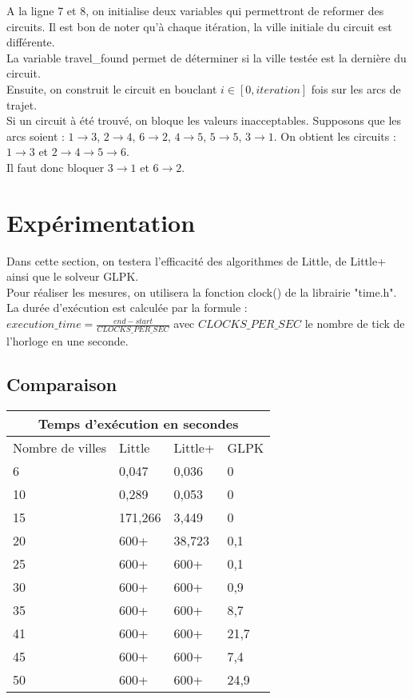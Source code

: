 \documentclass[a4paper]{article}
\begin{document}
A la ligne 7 et 8, on initialise deux variables qui permettront de reformer des circuits. Il est bon de noter qu'à chaque itération, la ville initiale du circuit est différente.\\
La variable travel\_found permet de déterminer si la ville testée est la dernière du circuit.\\
Ensuite, on construit le circuit en bouclant $i\in[0,iteration]$ fois sur les arcs de trajet.\\
Si un circuit à été trouvé, on bloque les valeurs inacceptables. Supposons que les arcs soient : 
$1 \rightarrow 3$,
$2 \rightarrow 4$,
$6 \rightarrow 2$,
$4 \rightarrow 5$,
$5 \rightarrow 5$,
$3 \rightarrow 1$.
On obtient les circuits : 
$1 \rightarrow 3$ et $2\rightarrow 4 \rightarrow 5 \rightarrow 6$.\\
Il faut donc bloquer $3 \rightarrow 1$ et $6 \rightarrow 2$.

\section{Expérimentation}

Dans cette section, on testera l'efficacité des algorithmes de Little, de Little+ ainsi que le solveur GLPK.\\
Pour réaliser les mesures, on utilisera la fonction clock() de la librairie "time.h". La durée d'exécution est calculée par la formule : $execution\_time = \frac{end-start}{CLOCKS\_PER\_SEC}$ avec $CLOCKS\_PER\_SEC$ le nombre de tick de l'horloge en une seconde.

\subsection{Comparaison}

\begin{table}[!ht]
    \begin{tabular}{ |p{2.5cm}||p{2.5cm}|p{2.5cm}|p{2.5cm}|  }
     \hline
     \multicolumn{4}{|c|}{Temps d'exécution en secondes} \\
     \hline
     Nombre de villes& Little &Little+&GLPK\\
     \hline
     6   & 0,047    &0,036   &   0\\
     10  &   0,289  & 0,053  &0\\
     15  &171,266   & 3,449  &  0\\
     20  & 600+      & 38,723 &  0,1\\
     25  &   600+   & 600+   &0,1\\
     30  & 600+     & 600+   &0,9\\
     35  &  600+    & 600+   &8,7\\
     41  & 600+     & 600+   &21,7\\
     45  & 600+     & 600+   &7,4\\
     50  & 600+     & 600+   &24,9\\
     \hline
    \end{tabular}
\end{table}
\end{document}
